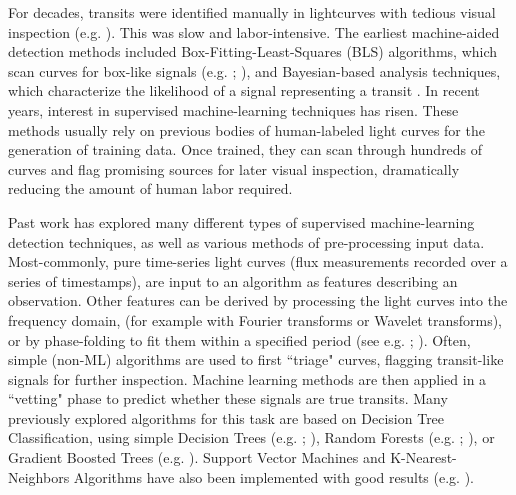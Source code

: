 \documentclass{article}
\begin{document}
For decades, transits were identified manually in lightcurves with tedious visual inspection (e.g. \citealp{Charbonneau2000}). This was slow and labor-intensive. The earliest machine-aided detection methods included Box-Fitting-Least-Squares (BLS) algorithms, which scan curves for box-like signals (e.g. \citealp{Kovac2002}; \citealp{Grziwa2012}), and Bayesian-based analysis techniques, which characterize the likelihood of a signal representing a transit \citep{Aigrain2002}. In recent years, interest in supervised machine-learning techniques has risen. These methods usually rely on previous bodies of human-labeled light curves for the generation of training data. Once trained, they can scan through hundreds of curves and flag promising sources for later visual inspection, dramatically reducing the amount of human labor required. 


Past work has explored many different types of supervised machine-learning detection techniques, as well as various methods of pre-processing input data. Most-commonly, pure time-series light curves (flux measurements recorded over a series of timestamps), are input to an algorithm as features describing an observation. Other features can be derived by processing the light curves into the frequency domain, (for example with Fourier transforms or Wavelet transforms), or by phase-folding to fit them within a specified period (see e.g. \citealp{Stumpe2014}; \citealp{Pearson2018}). Often, simple (non-ML) algorithms are used to first ``triage" curves, flagging transit-like signals for further inspection. Machine learning methods are then applied in a ``vetting" phase to predict whether these signals are true transits. Many previously explored algorithms for this task are based on Decision Tree Classification, using simple Decision Trees (e.g. \citealp{Coughlin_2016}; \citealp{Catanzarite_2015}), Random Forests (e.g. \citealp{Armstrong_2015}; \citealp{McCauliff_2015}), or Gradient Boosted Trees (e.g. \citealp{Malik_2021}). Support Vector Machines and K-Nearest-Neighbors Algorithms have also been implemented with good results (e.g. \citealp{Schanche_2018}). 
\end{document}
